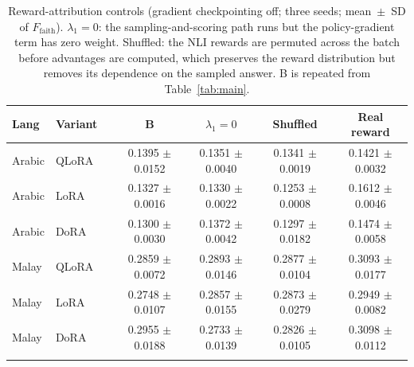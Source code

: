 \begin{table}[t]
\centering
\caption{Reward-attribution controls (gradient checkpointing off; three seeds; mean~$\pm$~SD of $F_{\text{faith}}$). $\lambda_1{=}0$: the sampling-and-scoring path runs but the policy-gradient term has zero weight. Shuffled: the NLI rewards are permuted across the batch before advantages are computed, which preserves the reward distribution but removes its dependence on the sampled answer. B is repeated from Table~\ref{tab:main}.}
\label{tab:attrib}
\footnotesize
\begin{tabular}{@{}lllcccc@{}}
\toprule
\textbf{Lang} & \textbf{Variant} & & B & $\lambda_1{=}0$ & Shuffled & Real reward \\
\midrule
Arabic & QLoRA & & 0.1395 $\pm$ 0.0152 & 0.1351 $\pm$ 0.0040 & 0.1341 $\pm$ 0.0019 & 0.1421 $\pm$ 0.0032 \\
Arabic & LoRA & & 0.1327 $\pm$ 0.0016 & 0.1330 $\pm$ 0.0022 & 0.1253 $\pm$ 0.0008 & 0.1612 $\pm$ 0.0046 \\
Arabic & DoRA & & 0.1300 $\pm$ 0.0030 & 0.1372 $\pm$ 0.0042 & 0.1297 $\pm$ 0.0182 & 0.1474 $\pm$ 0.0058 \\
\midrule
Malay & QLoRA & & 0.2859 $\pm$ 0.0072 & 0.2893 $\pm$ 0.0146 & 0.2877 $\pm$ 0.0104 & 0.3093 $\pm$ 0.0177 \\
Malay & LoRA & & 0.2748 $\pm$ 0.0107 & 0.2857 $\pm$ 0.0155 & 0.2873 $\pm$ 0.0279 & 0.2949 $\pm$ 0.0082 \\
Malay & DoRA & & 0.2955 $\pm$ 0.0188 & 0.2733 $\pm$ 0.0139 & 0.2826 $\pm$ 0.0105 & 0.3098 $\pm$ 0.0112 \\
\botrule
\end{tabular}
\end{table}